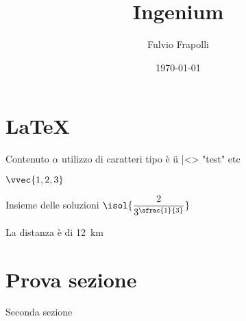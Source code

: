 \documentclass[]{article}
\title{Ingenium}
\author{Fulvio Frapolli}
\date{\today}
\begin{document}
\maketitle

\tableofcontents
\newpage



\section{\LaTeX}

Contenuto $\alpha$ utilizzo di caratteri tipo è ü |<> "test"
 etc

 $\vvec{1,2,3}$

 Insieme delle soluzioni $\isol{\dfrac{2}{3^{\sfrac{1}{3}}}}$

 La distanza è di \qty{12}{\km}    

\section{Prova sezione}

Seconda sezione
\end{document}
